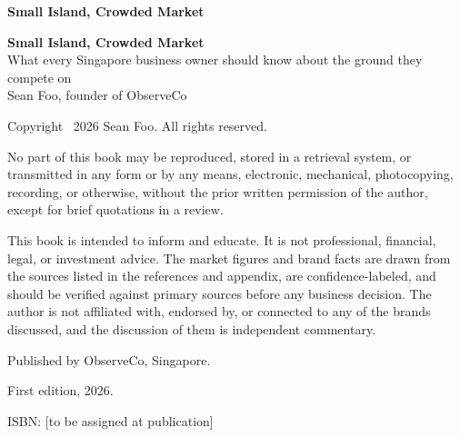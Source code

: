 \documentclass[10pt,twoside,openany]{memoir}
\begin{document}
\sloppy  %

\thispagestyle{empty}
\begin{center}
\vspace*{0.4\textheight}
{\Huge\bfseries\color{accent} Small Island, Crowded Market }
\end{center}
\cleardoublepage

\thispagestyle{empty}
\begin{center}
\vspace*{0.3\textheight}
{\Huge\bfseries\color{accent} Small Island, Crowded Market }\\[1em]
{\Large What every Singapore business owner should know about the ground they compete on }\\[3em]
{\large Sean Foo, founder of ObserveCo }
\end{center}
\cleardoublepage

\clearpage
\thispagestyle{empty}          %
\vspace*{0pt}                  %
{\footnotesize                 %
  \noindent Copyright \textcopyright\ 2026 Sean Foo. All rights reserved.\par
  \medskip
  \noindent No part of this book may be reproduced, stored in a retrieval system, or transmitted in any form or by any means, electronic, mechanical, photocopying, recording, or otherwise, without the prior written permission of the author, except for brief quotations in a review.\par
  \medskip
  \noindent This book is intended to inform and educate. It is not professional, financial, legal, or investment advice. The market figures and brand facts are drawn from the sources listed in the references and appendix, are confidence-labeled, and should be verified against primary sources before any business decision. The author is not affiliated with, endorsed by, or connected to any of the brands discussed, and the discussion of them is independent commentary.\par
  \medskip
  \noindent Published by ObserveCo, Singapore.\par
  \medskip
  \noindent First edition, 2026.\par
  \medskip
  \noindent ISBN: [to be assigned at publication]\par
}
\clearpage
\end{document}
